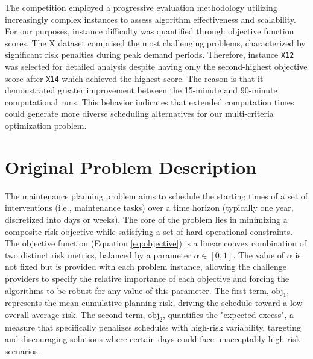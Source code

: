 The competition employed a progressive evaluation methodology utilizing increasingly complex instances to assess algorithm effectiveness and scalability. For our purposes, instance difficulty was quantified through objective function scores. The X dataset comprised the most challenging problems, characterized by significant risk penalties during peak demand periods. Therefore, instance \texttt{X12} was selected for detailed analysis despite having only the second-highest objective score after \texttt{X14} which achieved the highest score. The reason is that it demonstrated greater improvement between the 15-minute and 90-minute computational runs. This behavior indicates that extended computation times could generate more diverse scheduling alternatives for our multi-criteria optimization problem.


\section{Original Problem Description}

The maintenance planning problem aims to schedule the starting times of a set of interventions (i.e., maintenance tasks) over a time horizon (typically one year, discretized into days or weeks). The core of the problem lies in minimizing a composite risk objective while satisfying a set of hard operational constraints.\\

The objective function (Equation \ref{eq:objective}) is a linear convex combination of two distinct risk metrics, balanced by a parameter $\alpha \in [0,1]$. The value of $\alpha$ is not fixed but is provided with each problem instance, allowing the challenge providers to specify the relative importance of each objective and forcing the algorithms to be robust for any value of this parameter. The first term, $\mathrm{obj}_1$, represents the mean cumulative planning risk, driving the schedule toward a low overall average risk. The second term, $\mathrm{obj}_2$, quantifies the "expected excess", a measure that specifically penalizes schedules with high-risk variability, targeting and discouraging solutions where certain days could face unacceptably high-risk scenarios.\\

